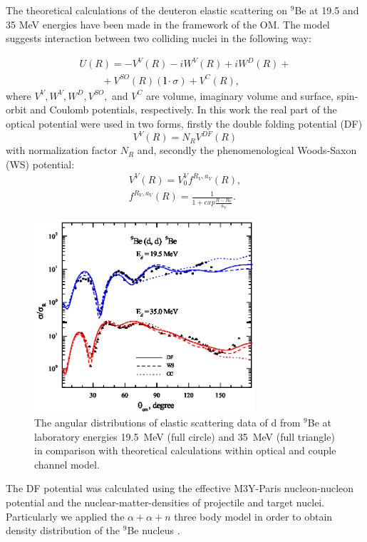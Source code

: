 \documentclass[10pt]{iopart}
\begin{document}
The theoretical calculations  of the deuteron  elastic scattering  on  $^9$Be  at 19.5 and 35 MeV energies have been made in the framework of the OM. The model suggests interaction between two colliding nuclei in the following way:

\begin{equation}\label{eqn:OP}
\begin{array}{l}
 U(R)=-V^{V}(R)-iW^{V}(R)+iW^D(R)+\\
~~~ ~~~~~~~+V^{SO}(R)( \mathbf{l} \cdot \sigma )+V^C(R),
\end{array}
\end{equation}
where $V^{V}, W^{V}, W^D, V^{SO},$ and $V^C$ are volume, imaginary volume and surface, spin-orbit and Coulomb potentials, respectively. In this work the real part of the optical potential were used in two forms, firstly the double folding potential (DF)
\begin{equation}
V^V(R) = N_R V^{DF}(R)
\end{equation}
with normalization factor $N_R$ and, secondly the phenomenological Woods-Saxon (WS) potential:
\begin{eqnarray}
V^V(R) =  V^V_0 f^{R_V, a_V}(R), \\
 f^{R_V,a_V}(R)=\frac{1}{1+exp{\frac{R-R_V}{a_V}}}.
\end{eqnarray}

\begin{figure}[tp]
\centering
\includegraphics[width=8.2cm]{2H9BE.eps}
\caption{ \label{2H9BE}  \footnotesize The angular distributions of elastic scattering data of d from $^9$Be at laboratory energies 19.5~MeV (full circle) and 35~MeV (full triangle) in comparison with theoretical calculations within optical and couple channel model.}
\end{figure}


The DF potential was calculated using the effective M3Y-Paris nucleon-nucleon potential and the nuclear-matter-densities of projectile and target nuclei. Particularly we applied the $\alpha+\alpha+n$ three body model in order to obtain density distribution of the $^9$Be nucleus \cite{urazbekov2016}.
\end{document}
